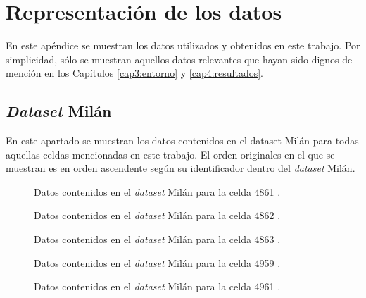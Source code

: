 \section{Representación de los datos}
En este apéndice se muestran los datos utilizados y obtenidos en este trabajo. Por simplicidad, sólo se muestran aquellos datos relevantes que hayan sido dignos de mención en los Capítulos \ref{cap3:entorno} y \ref{cap4:resultados}.

\subsection{\textit{Dataset} Milán}
En este apartado se muestran los datos contenidos en el dataset Milán para todas aquellas celdas mencionadas en este trabajo. El orden originales en el que se muestran es en orden ascendente según su identificador dentro del \textit{dataset} Milán.

\begin{figure}[h!]
	\centering
	
	\caption{Datos contenidos en el \textit{dataset} Milán para la celda 4861 \cite{milandataset}.}
	\label{4861}
\end{figure}
\FloatBarrier

\begin{figure}[h!]
	\centering
	
	\caption{Datos contenidos en el \textit{dataset} Milán para la celda 4862 \cite{milandataset}.}
	\label{4862}
\end{figure}
\FloatBarrier


\begin{figure}[h!]
	\centering
	
	\caption{Datos contenidos en el \textit{dataset} Milán para la celda 4863 \cite{milandataset}.}
	\label{4863}
\end{figure}
\FloatBarrier


\begin{figure}[h!]
	\centering
	
	\caption{Datos contenidos en el \textit{dataset} Milán para la celda 4959 \cite{milandataset}.}
	\label{4959}
\end{figure}
\FloatBarrier


\begin{figure}[h!]
	\centering
	
	\caption{Datos contenidos en el \textit{dataset} Milán para la celda 4961 \cite{milandataset}.}
	\label{4961}
\end{figure}
\FloatBarrier

